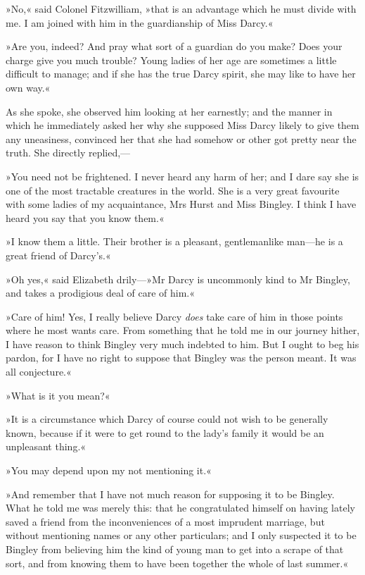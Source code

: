 »No,« said Colonel Fitzwilliam, »that is an advantage which he must divide with me. I am joined with him in the guardianship of Miss Darcy.«

»Are you, indeed? And pray what sort of a guardian do you make? Does your charge give you much trouble? Young ladies of her age are sometimes a little difficult to manage; and if she has the true Darcy spirit, she may like to have her own way.«

As she spoke, she observed him looking at her earnestly; and the manner in which he immediately asked her why she supposed Miss Darcy likely to give them any uneasiness, convinced her that she had somehow or other got pretty near the truth. She directly replied,—

»You need not be frightened. I never heard any harm of her; and I dare say she is one of the most tractable creatures in the world. She is a very great favourite with some ladies of my acquaintance, Mrs Hurst and Miss Bingley. I think I have heard you say that you know them.«

»I know them a little. Their brother is a pleasant, gentlemanlike man—he is a great friend of Darcy's.«

»Oh yes,« said Elizabeth drily—»Mr Darcy is uncommonly kind to Mr Bingley, and takes a prodigious deal of care of him.«

»Care of him! Yes, I really believe Darcy \textit{does} take care of him in those points where he most wants care. From something that he told me in our journey hither, I have reason to think Bingley very much indebted to him. But I ought to beg his pardon, for I have no right to suppose that Bingley was the person meant. It was all conjecture.«

»What is it you mean?«

»It is a circumstance which Darcy of course could not wish to be generally known, because if it were to get round to the lady's family it would be an unpleasant thing.«

»You may depend upon my not mentioning it.«

»And remember that I have not much reason for supposing it to be Bingley. What he told me was merely this: that he congratulated himself on having lately saved a friend from the inconveniences of a most imprudent marriage, but without mentioning names or any other particulars; and I only suspected it to be Bingley from believing him the kind of young man to get into a scrape of that sort, and from knowing them to have been together the whole of last summer.«

